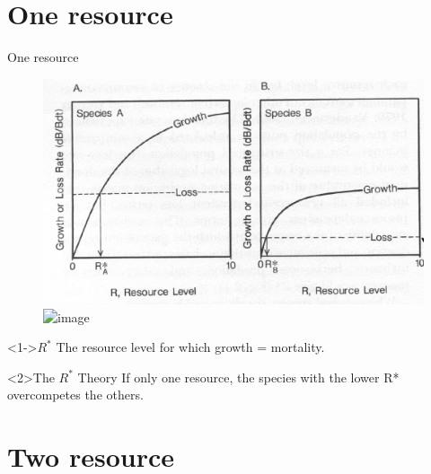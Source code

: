 \documentclass[final,xcolor=dvipsnames]{beamer}
\begin{document}
\section{One resource}

\begin{frame}{One resource}
\begin{figure}
\includegraphics[width=.5\framewidth]{1ressourceGrowth}
\includegraphics<2>[width=.4\framewidth]{1RessourceCompetition}
\end{figure}
\begin{block}<1->{$R^*$}
The resource level for which growth = mortality.
\end{block}
\begin{block}<2>{The $R^*$ Theory}
If only one resource, the species with the lower R* overcompetes the others. 
\end{block}
\end{frame}

\section{Two resource}
\end{document}
